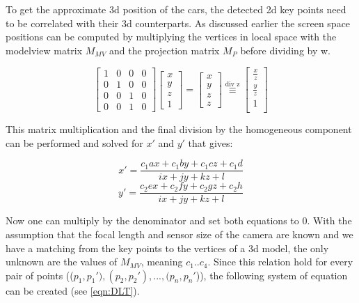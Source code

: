 \documentclass[conference]{IEEEtran}
\begin{document}
To get the approximate 3d position of the cars, the detected 2d key points need to be correlated with their 3d counterparts. As discussed earlier the screen space positions can be computed by multiplying the vertices in local space with the modelview matrix $M_{MV}$ and the projection matrix $M_P$ before dividing by w.

\begin{equation}
    \begin{bmatrix}
        1 & 0 & 0 & 0 \\
        0 & 1 & 0 & 0 \\
        0 & 0 & 1 & 0 \\
        0 & 0 & 1 & 0
    \end{bmatrix}
    \begin{bmatrix}
        x \\
        y \\
        z \\
        1
    \end{bmatrix}
    =
    \begin{bmatrix}
        x \\
        y \\
        z \\
        z
    \end{bmatrix}
    \overset{\text{div z}}{\equiv}
    \begin{bmatrix}
        \frac{x}{z} \\
        \frac{y}{z} \\
        1           \\
    \end{bmatrix}
\end{equation}

This matrix multiplication and the final division by the homogeneous component can be performed and solved for $x'$ and $y'$ that gives:

\begin{equation}
    x' = \frac{c_1 a x + c_1 b y + c_1 c z + c_1 d}{ix + jy + kz + l}
\end{equation}
\begin{equation}
    y' = \frac{c_2 e x + c_2 f y + c_2 g z + c_2 h}{ix + jy + kz + l}
\end{equation}

Now one can multiply by the denominator and set both equations to 0. With the assumption that the focal length and sensor size of the camera are known and we have a matching from the key points to the vertices of a 3d model, the only unknown are the values of $M_{MV}$, meaning $c_{1}..c_{4}$. Since this relation hold for every pair of points (($p_{1} , p_{1}'), (p_{2} , p_{2}'), ..., (p_{n}, p_{n}'$)), the following system of equation can be created (see \ref{eqn:DLT}).
\end{document}

